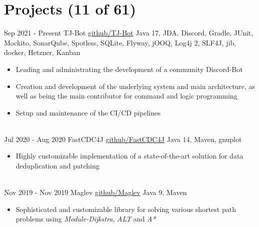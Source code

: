 \documentclass[letterpaper]{twentysecondcv} %
\begin{document}
\section{Projects (11 of 61)}
\begin{twenty} %
	\twentyitem
    		{Sep 2021 -}
		{Present}
        		{TJ-Bot}
        		{\href{https://github.com/Together-Java/TJ-Bot}{github/TJ-Bot}}
        		{Java 17, JDA, Discord, Gradle, JUnit, Mockito, SonarQube, Spotless, SQLite, Flyway, jOOQ, Log4j 2, SLF4J, jib, docker, Hetzner, Kanban}
        		{\begin{itemize}
        			\item Leading and administrating the development of a community Discord-Bot
        			\item Creation and development of the underlying system and main architecture,
        			as well as being the main contributor for command and logic programming
        			\item Setup and maintenance of the CI/CD pipelines
        		\end{itemize}}\\
	\twentyitem
    		{Jul 2020 -}
		{Aug 2020}
        		{FastCDC4J}
        		{\href{https://github.com/Zabuzard/FastCDC4J}{github/FastCDC4J}}
        		{Java 14, Maven, gnuplot}
        		{\begin{itemize}
        			\item Highly customizable implementation of a state-of-the-art solution for data deduplication and patching
        		\end{itemize}}\\
	\twentyitem
    		{Nov 2019 -}
		{Nov 2019}
        		{Maglev}
        		{\href{https://github.com/Zabuzard/Maglev}{github/Maglev}}
        		{Java 9, Maven}
        		{\begin{itemize}
        			\item Sophisticated and customizable library for solving various shortest path problems using \textit{Module-Dijkstra}, \textit{ALT} and \textit{A*}
        		\end{itemize}}
\end{twenty}

\newpage

\makesidebarThird %

\vspace{10mm}
\end{document}
